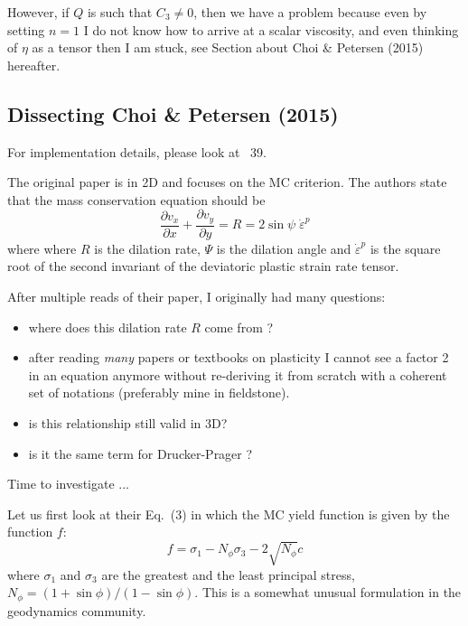 However, if $Q$ is such that $C_3\neq 0$, then we have a problem because 
even by setting $n=1$ I do not know how to arrive at a scalar viscosity, 
and even thinking of $\eta$ as a tensor then I am stuck, see Section about 
Choi \& Petersen (2015) hereafter.


\newpage
\subsection{Dissecting Choi \& Petersen (2015)}

For implementation details, please look at \stone~39. 

The original paper \cite{chpe15} is in 2D and focuses on the MC criterion. 
The authors state that the mass conservation equation should be 
\[
\frac{\partial v_x}{\partial x}
+
\frac{\partial v_y}{\partial y}
=
R=2 \sin \psi \; \dot{\varepsilon}^p
\]
where where $R$ is the dilation rate, $\Psi$ is the dilation angle and
$\dot{\varepsilon}^p$ is the square root of the second invariant of the deviatoric plastic strain rate tensor.

After multiple reads of their paper, I originally had many questions:
\begin{itemize}
\item where does this dilation rate $R$ come from ? 
\item after reading \textit{many} papers or textbooks on plasticity 
I cannot see a factor 2 in an equation anymore without re-deriving 
it from scratch with a coherent set of notations (preferably mine in fieldstone). 
\item is this relationship still valid in 3D?
\item is it the same term for Drucker-Prager ?
\end{itemize}
Time to investigate ...
\vspace{1cm}

Let us first look at their Eq.~(3)  in which  
the MC yield function is given by the function $f$:
\[
f = \sigma_1 - N_\phi \sigma_3 - 2 \sqrt{N_\phi} c 
\]
where $\sigma_1$ and $\sigma_3$ are the greatest and the least principal stress, $N_\phi=(1+\sin \phi)/(1-\sin \phi)$.
This is a somewhat unusual formulation in the geodynamics community.

